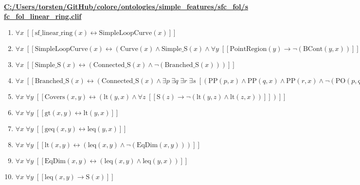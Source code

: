 \documentclass{article}
\begin{document}
\textbf{\url{C:/Users/torsten/GitHub/colore/ontologies/simple\_features/sfc\_fol/sfc\_fol\_linear\_ring.clif}}

\begin{enumerate}
\item $\forall x\;  \left[ \left[ \textrm{sf\_linear\_ring}(x) \leftrightarrow \textrm{SimpleLoopCurve}(x) \right] \right]$
\item $\forall x\;  \left[ \left[ \textrm{SimpleLoopCurve}(x) \leftrightarrow \left(\textrm{Curve}(x) \land \textrm{Simple\_S}(x) \land \forall y\;  \left[ \left[ \textrm{PointRegion}(y) \rightarrow \neg \left(\textrm{BCont}(y,x)\right) \right] \right]\right) \right] \right]$
\item $\forall x\;  \left[ \left[ \textrm{Simple\_S}(x) \leftrightarrow \left(\textrm{Connected\_S}(x) \land \neg \left(\textrm{Branched\_S}(x)\right)\right) \right] \right]$
\item $\forall x\;  \left[ \left[ \textrm{Branched\_S}(x) \leftrightarrow \left(\textrm{Connected\_S}(x) \land \exists p\; \exists q\; \exists r\; \exists s\;  \left[ \left(\textrm{PP}(p,x) \land \textrm{PP}(q,x) \land \textrm{PP}(r,x) \land \neg \left(\textrm{PO}(p,q)\right) \land \neg \left(\textrm{PO}(p,r)\right) \land \neg \left(\textrm{PO}(q,r)\right) \land \textrm{Covers}(p,s) \land \textrm{Covers}(q,s) \land \textrm{Covers}(r,s) \land \textrm{Cont}(s,p) \land \textrm{Cont}(s,q) \land \textrm{Cont}(s,r)\right) \right]\right) \right] \right]$
\item $\forall x\; \forall y\;  \left[ \left[ \textrm{Covers}(x,y) \leftrightarrow \left(\textrm{lt}(y,x) \land \forall z\;  \left[ \left[ \textrm{S}(z) \rightarrow \neg \left(\textrm{lt}(y,z) \land \textrm{lt}(z,x)\right) \right] \right]\right) \right] \right]$
\item $\forall x\; \forall y\;  \left[ \left[ \textrm{gt}(x,y) \leftrightarrow \textrm{lt}(y,x) \right] \right]$
\item $\forall x\; \forall y\;  \left[ \left[ \textrm{geq}(x,y) \leftrightarrow \textrm{leq}(y,x) \right] \right]$
\item $\forall x\; \forall y\;  \left[ \left[ \textrm{lt}(x,y) \leftrightarrow \left(\textrm{leq}(x,y) \land \neg \left(\textrm{EqDim}(x,y)\right)\right) \right] \right]$
\item $\forall x\; \forall y\;  \left[ \left[ \textrm{EqDim}(x,y) \leftrightarrow \left(\textrm{leq}(x,y) \land \textrm{leq}(y,x)\right) \right] \right]$
\item $\forall x\; \forall y\;  \left[ \left[ \textrm{leq}(x,y) \rightarrow \textrm{S}(x) \right] \right]$

\end{enumerate}
\end{document}
